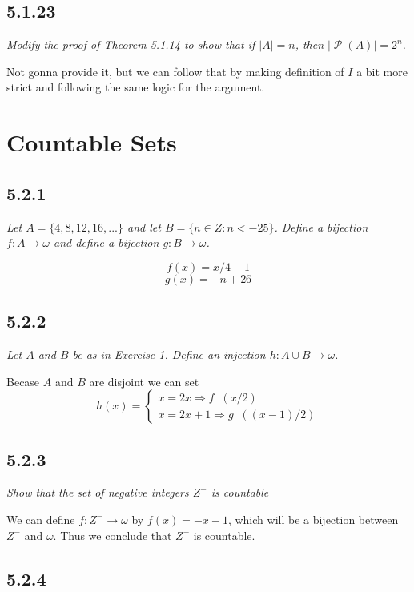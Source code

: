 \documentclass[11pt,oneside,titlepage]{book}
\DeclareMathOperator \pow {\mathcal {P}}
\DeclareMathOperator \inv {^{-1}}
\DeclareMathOperator \ra {\Rightarrow}
\begin{document}
\subsection*{5.1.23}

\textit{Modify the proof of Theorem 5.1.14 to show that if $|A| = n$, then $|\pow(A)| = 2^n$.}

Not gonna provide it, but we can follow that by making definition of $I$ a bit more strict and
following the same logic for the argument.

\section{Countable Sets}

\subsection*{5.2.1}

\textit{Let $A = \{4, 8, 12, 16, ...\}$ and let $B = \{n \in Z: n < -25\}$. Define a bijection
  $f: A \to \omega$ and define a bijection $g: B \to \omega$.}

$$f(x) = x/4 - 1$$
$$g(x) = -n + 26$$

\subsection*{5.2.2}

\textit{Let $A$ and $B$ be as in Exercise 1. Define an injection $h: A \cup B \to \omega$.}

Becase $A$ and $B$ are disjoint we can set
$$h(x) =
\begin{cases}
  x = 2x \ra f\inv(x / 2) \\
  x = 2x + 1 \ra g\inv((x - 1) / 2) 
\end{cases}
$$

\subsection*{5.2.3}

\textit{Show that the set of negative integers $Z^-$ is countable}

We can define $f: Z^- \to \omega$ by $f(x) = -x - 1$, which will be a bijection between
$Z^-$ and $\omega$. Thus we conclude that $Z^-$ is countable.

\subsection*{5.2.4}
\end{document}
